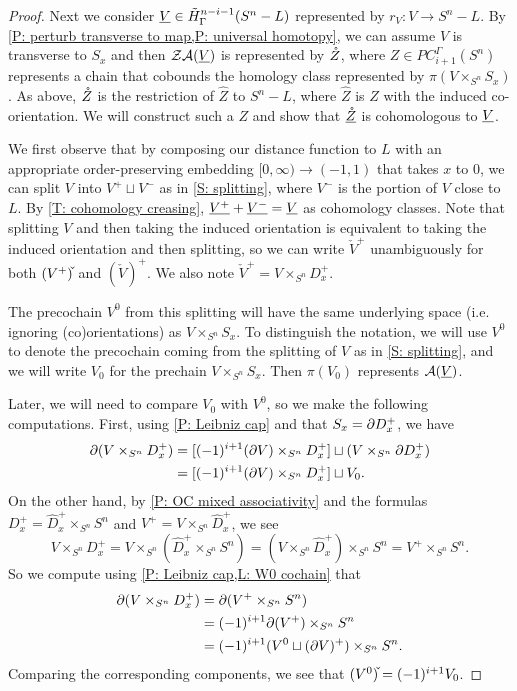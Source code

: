 \begin{proof}
	Next we consider $\underline{V} \in \tilde H^{n-i-1}_\Gamma(S^n-L)$ represented by $r_V \colon V \to S^n-L$.
	By \cref{P: perturb transverse to map,P: universal homotopy}, we can assume $V$ is transverse to $S_x$ and then $\mathcal{Z} \mathcal{A}(\underline{V})$ is represented by $\mathring{Z}$, where $Z \in PC_{i+1}^\Gamma(S^n)$ represents a chain that cobounds the homology class represented by $\pi(V \times_{S^n} S_x)$.
	As above, $\mathring{Z}$ is the restriction of $\hat Z$ to $S^n-L$, where $\hat Z$ is $Z$ with the induced co-orientation.
	We will construct such a $Z$ and show that $\underline{\mathring{Z}}$ is cohomologous to $\underline{V}$.

	We first observe that by composing our distance function to $L$ with an appropriate order-preserving embedding $[0,\infty) \to (-1,1)$ that takes $x$ to $0$, we can split $V$ into $V^+ \sqcup V^-$ as in \cref{S: splitting}, where $V^-$ is the portion of $V$ close to $L$.
	By \cref{T: cohomology creasing}, $\underline{V^+} + \underline{V^-} = \underline{V}$ as cohomology classes.
	Note that splitting $V$ and then taking the induced orientation is equivalent to taking the induced orientation and then splitting, so we can write $\check V^+$ unambiguously for both $(V^+)\check{\vrule height1.3ex width0pt}$ and $(\check V)^+$.
	We also note $\check V^+ = V \times_{S^n} D_x^+$.

	The precochain $V^0$ from this splitting will have the same underlying space (i.e. ignoring (co)orientations) as $V \times_{S^n} S_x$.
	To distinguish the notation, we will use $V^0$ to denote the precochain coming from the splitting of $V$ as in \cref{S: splitting}, and we will write $V_0$ for the prechain $V \times_{S^n} S_x$.
	Then $\pi(V_0)$ represents $\mathcal{A}(\underline{V})$.

	Later, we will need to compare $V_0$ with $V^0$, so we make the following computations.
	First, using \cref{P: Leibniz cap} and that $S_x = \partial D_x^+$, we have
	\begin{align*}
		\partial(V \times_{S^n} D^+_x) &= [(-1)^{i+1} (\partial V)\times_{S^n} D^+_x] \sqcup (V \times_{S^n} \partial D^+_x)\\
		&=[(-1)^{i+1} (\partial V)\times_{S^n} D^+_x] \sqcup V_0.
	\end{align*}
	On the other hand, by \cref{P: OC mixed associativity} and the formulas $D^+_x = \hat D^+_x \times_{S^n} S^n$ and $V^+ = V \times_{S^n} \hat D^+_x$, we see $$V \times_{S^n} D^+_x = V \times_{S^n}(\hat D^+_x \times_{S^n} S^n) = (V \times_{S^n} \hat D^+_x ) \times_{S^n} S^n = V^+ \times_{S^n} S^n.$$
	So we compute using \cref{P: Leibniz cap,L: W0 cochain} that
	\begin{align*}
		\partial(V \times_{S^n} D^+_x) &= \partial(V^+ \times_{S^n} S^n )\\
		&= (-1)^{i+1}\partial (V^+) \times_{S^n} S^n\\
		&= (-1)^{i+1} (V^0 \sqcup (\partial V)^+) \times_{S^n} S^n.
	\end{align*}
	Comparing the corresponding components, we see that $(V^0)\check{\vrule height1.3ex width0pt} = (-1)^{i+1}V_0$.



\end{proof}
